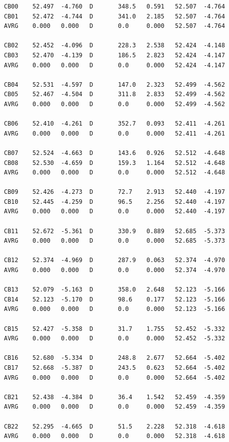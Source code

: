 \documentclass[10pt]{article}
\begin{document}
\begin{verbatim}
CB00    52.497  -4.760  D       348.5   0.591   52.507  -4.764
CB01    52.472  -4.744  D       341.0   2.185   52.507  -4.764
AVRG    0.000   0.000   D       0.0     0.000   52.507  -4.764

CB02    52.452  -4.096  D       228.3   2.538   52.424  -4.148
CB03    52.470  -4.139  D       186.5   2.823   52.424  -4.147
AVRG    0.000   0.000   D       0.0     0.000   52.424  -4.147

CB04    52.531  -4.597  D       147.0   2.323   52.499  -4.562
CB05    52.467  -4.504  D       311.8   2.833   52.499  -4.562
AVRG    0.000   0.000   D       0.0     0.000   52.499  -4.562

CB06    52.410  -4.261  D       352.7   0.093   52.411  -4.261
AVRG    0.000   0.000   D       0.0     0.000   52.411  -4.261

CB07    52.524  -4.663  D       143.6   0.926   52.512  -4.648
CB08    52.530  -4.659  D       159.3   1.164   52.512  -4.648
AVRG    0.000   0.000   D       0.0     0.000   52.512  -4.648

CB09    52.426  -4.273  D       72.7    2.913   52.440  -4.197
CB10    52.445  -4.259  D       96.5    2.256   52.440  -4.197
AVRG    0.000   0.000   D       0.0     0.000   52.440  -4.197

CB11    52.672  -5.361  D       330.9   0.889   52.685  -5.373
AVRG    0.000   0.000   D       0.0     0.000   52.685  -5.373

CB12    52.374  -4.969  D       287.9   0.063   52.374  -4.970
AVRG    0.000   0.000   D       0.0     0.000   52.374  -4.970

CB13    52.079  -5.163  D       358.0   2.648   52.123  -5.166
CB14    52.123  -5.170  D       98.6    0.177   52.123  -5.166
AVRG    0.000   0.000   D       0.0     0.000   52.123  -5.166

CB15    52.427  -5.358  D       31.7    1.755   52.452  -5.332
AVRG    0.000   0.000   D       0.0     0.000   52.452  -5.332

CB16    52.680  -5.334  D       248.8   2.677   52.664  -5.402
CB17    52.668  -5.387  D       243.5   0.623   52.664  -5.402
AVRG    0.000   0.000   D       0.0     0.000   52.664  -5.402

CB21    52.438  -4.384  D       36.4    1.542   52.459  -4.359
AVRG    0.000   0.000   D       0.0     0.000   52.459  -4.359

CB22    52.295  -4.665  D       51.5    2.228   52.318  -4.618
AVRG    0.000   0.000   D       0.0     0.000   52.318  -4.618


\end{verbatim}
\end{document}

